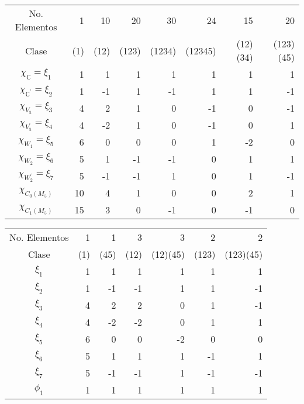 \documentclass[12pt]{book}
\theoremstyle{definition}
\newcounter{in}
\begin{document}
{\bigskip

\begin{center}
\begin{small}
\begin{tabular}{c |r r r r r r r}
  No. Elementos& 1 & 10 & 20 & 30 & 24 & 15 & 20  \\
  Clase & (1) & (12) & (123) & (1234) & (12345) & (12)(34) & (123)(45) \\
    \hline
  $\chi_{\mathbb{C}}=\xi_{1}$ & 1 & 1 & 1 & 1 & 1 & 1 & 1 \\
  $\chi_{\mathbb{C}^{'}}=\xi_{2}$ & 1 & -1 & 1 & -1 & 1 & 1 & -1\\
  $\chi_{V_{5}}=\xi_{3}$ & 4 & 2 & 1 & 0 & -1 & 0 & -1\\
  $\chi_{V_{5}^{'}}=\xi_{4}$ & 4 & -2 & 1 & 0 & -1 & 0 & 1 \\
  $\chi_{W_{1}}=\xi_{5}$ & 6 & 0 & 0 & 0 & 1 & -2 & 0 \\
  $\chi_{W_{2}}=\xi_{6}$ & 5 & 1 & -1 & -1 & 0 & 1 & 1 \\
  $\chi_{W_{2}^{'}}=\xi_{7}$ & 5 & -1 & -1 & 1 & 0 & 1 & -1 \\
  \hline
  $\chi_{C_{0}(M_{5})}$ & 10 & 4 & 1 & 0 & 0 & 2 & 1 \\
  $\chi_{C_{1}(M_{5})}$ & 15 & 3 & 0 & -1 & 0 & -1 & 0
\end{tabular}
\end{small}
\end{center}

\bigskip

\begin{tabular}{c |r r r r r r}
  No. Elementos& 1 & 1 & 3 & 3 & 2 & 2 \\
  Clase & (1) & (45) & (12) & (12)(45) & (123) & (123)(45) \\
    \hline
  $\xi_{1}$ & 1 & 1 & 1 & 1 & 1 & 1 \\
  $\xi_{2}$ & 1 & -1 & -1 & 1 & 1 & -1 \\
  $\xi_{3}$ & 4 & 2 & 2 & 0 & 1 & -1 \\
  $\xi_{4}$ & 4 & -2 & -2 & 0 & 1 & 1 \\
  $\xi_{5}$ & 6 & 0 & 0 & -2 & 0 & 0 \\
  $\xi_{6}$ & 5 & 1 & 1 & 1 & -1 & 1 \\
  $\xi_{7}$ & 5 & -1 & -1 & 1 & -1 & -1 \\
  \hline
  $\phi_{1}$ & 1 & 1 & 1 & 1 & 1 & 1 \\
\end{tabular}

\bigskip

}
\end{document}
